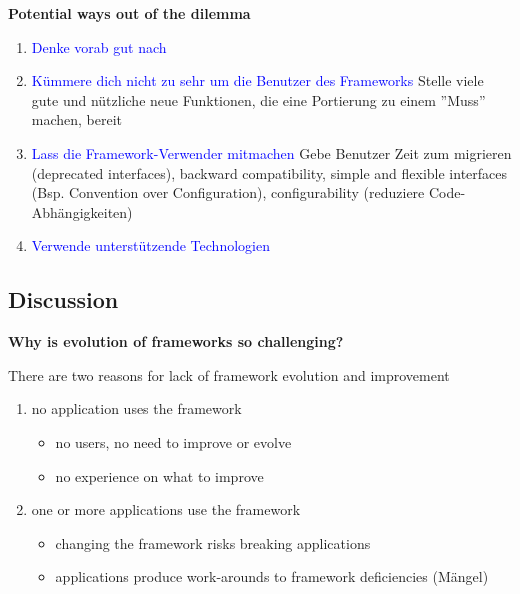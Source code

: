\textbf{Potential ways out of the dilemma}
\begin{enumerate}
    \item \textcolor{blue}{Denke vorab gut nach}
    \item \textcolor{blue}{Kümmere dich nicht zu sehr um die Benutzer des Frameworks} Stelle viele gute und nützliche neue Funktionen, die eine Portierung zu einem ''Muss'' machen, bereit
    \item \textcolor{blue}{Lass die Framework-Verwender mitmachen} Gebe Benutzer Zeit zum migrieren (deprecated interfaces), backward compatibility, simple and flexible interfaces (Bsp. Convention over Configuration), configurability (reduziere Code-Abhängigkeiten)
    \item \textcolor{blue}{Verwende unterstützende Technologien}
\end{enumerate}

\subsection{Discussion}

\textbf{Why is evolution of frameworks so challenging?}

There are two reasons for lack of framework evolution and improvement
\begin{enumerate}
    \item no application uses the framework
    \begin{itemize}
        \item no users, no need to improve or evolve
        \item no experience on what to improve
    \end{itemize}
    \item one or more applications use the framework
    \begin{itemize}
        \item changing the framework risks breaking applications
        \item applications produce work-arounds to framework deficiencies (Mängel)
    \end{itemize}
\end{enumerate}
